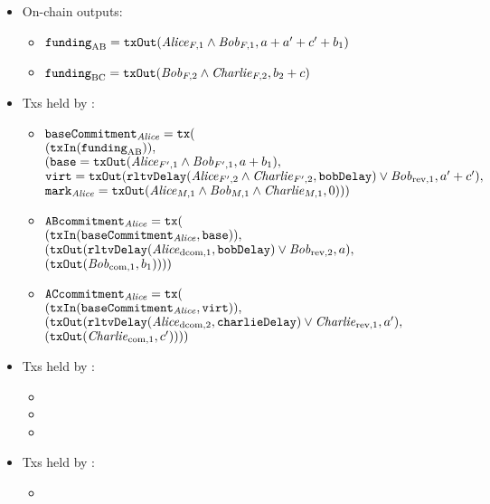   \begin{itemize}
    \item On-chain outputs:
    \begin{itemize}
      \item $\mathtt{funding}_{\mathrm{AB}} = \mathtt{txOut}(\mathit{Alice}_{F, 1} \wedge
      \mathit{Bob}_{F, 1}, a + a' + c' + b_1)$
      \item $\mathtt{funding}_{\mathrm{BC}} = \mathtt{txOut}(\mathit{Bob}_{F, 2} \wedge
      \mathit{Charlie}_{F, 2}, b_2 + c)$
    \end{itemize}
    \item Txs held by \alice:
    \begin{itemize}
      \item $\mathtt{baseCommitment}_{\mathit{Alice}} = \texttt{tx}($ \\
        $(\mathtt{txIn}(\mathtt{funding}_{\mathrm{AB}})),$ \\
        $(\mathtt{base} = \mathtt{txOut}(\mathit{Alice}_{F', 1} \wedge \mathit{Bob}_{F', 1}, a + b_1),$
        \\
        $\mathtt{virt} = \mathtt{txOut}(\mathtt{rltvDelay}(\mathit{Alice}_{F', 2} \wedge \mathit{Charlie}_{F', 2},
        \mathtt{bobDelay}) \vee \mathit{Bob}_{\mathrm{rev}, 1}, a' + c'),$ \\
        $\mathtt{mark}_{\mathit{Alice}} = \mathtt{txOut}(\mathit{Alice}_{M, 1} \wedge \mathit{Bob}_{M, 1} \wedge
        \mathit{Charlie}_{M, 1}, 0)))$
      \item $\mathtt{ABcommitment}_{\mathit{Alice}} = \texttt{tx}($ \\
        $(\mathtt{txIn}(\mathtt{baseCommitment}_{\mathit{Alice}}, \mathtt{base})),$  \\
        $(\mathtt{txOut}(\mathtt{rltvDelay}(\mathit{Alice}_{\mathrm{dcom}, 1}, \mathtt{bobDelay}) \vee
        \mathit{Bob}_{\mathrm{rev}, 2}, a),$ \\
        $(\mathtt{txOut}(\mathit{Bob}_{\mathrm{com}, 1}, b_1))))$
      \item $\mathtt{ACcommitment}_{\mathit{Alice}} = \texttt{tx}($ \\
        $(\mathtt{txIn}(\mathtt{baseCommitment}_{\mathit{Alice}}, \mathtt{virt})),$ \\
        $(\mathtt{txOut}(\mathtt{rltvDelay}(\mathit{Alice}_{\mathrm{dcom}, 2}, \mathtt{charlieDelay}) \vee
        \mathit{Charlie}_{\mathrm{rev}, 1}, a'),$ \\
        $(\mathtt{txOut}(\mathit{Charlie}_{\mathrm{com}, 1}, c'))))$
    \end{itemize}
    \item Txs held by \bob:
    \begin{itemize}
      \item
      \item
      \item
    \end{itemize}
    \item Txs held by \charlie:
    \begin{itemize}
      \item
    \end{itemize}
  \end{itemize}
